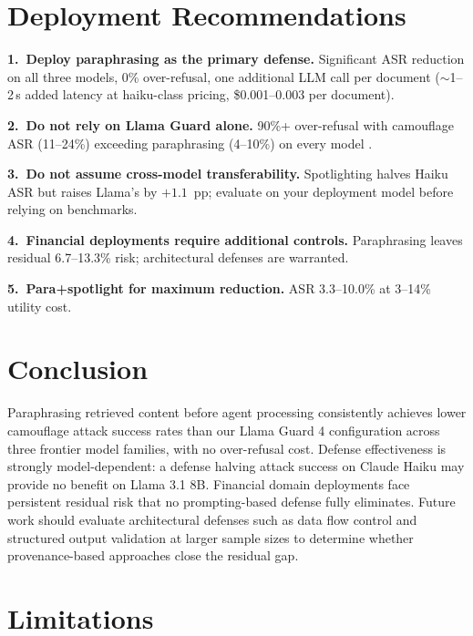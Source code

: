 \documentclass[11pt]{article}
\begin{document}
\section{Deployment Recommendations}

\textbf{1.~Deploy paraphrasing as the primary defense.}
Significant ASR reduction on all three models, 0\% over-refusal,
one additional LLM call per document ($\sim$1--2\,s added latency
at haiku-class pricing, \$0.001--0.003 per document).

\textbf{2.~Do not rely on Llama Guard alone.}
90\%+ over-refusal with camouflage ASR (11--24\%) exceeding
paraphrasing (4--10\%) on every model \citep{meta2024llamaguard3,inan2023llama}.

\textbf{3.~Do not assume cross-model transferability.}
Spotlighting halves Haiku ASR but raises Llama's by $+1.1$~pp;
evaluate on your deployment model before relying on benchmarks.

\textbf{4.~Financial deployments require additional controls.}
Paraphrasing leaves residual 6.7--13.3\% risk; architectural defenses
\citep{wallace2024instruction} are warranted.

\textbf{5.~Para+spotlight for maximum reduction.}
ASR 3.3--10.0\% at 3--14\% utility cost.

\section{Conclusion}

Paraphrasing retrieved content before agent processing consistently
achieves lower camouflage attack success rates than our Llama Guard 4
configuration across three frontier model families, with no over-refusal cost. Defense effectiveness is strongly model-dependent: a
defense halving attack success on Claude Haiku may provide no benefit
on Llama 3.1 8B. Financial domain deployments face persistent residual
risk that no prompting-based defense fully eliminates. Future work
should evaluate architectural defenses such as data flow control
\citep{google2025camel} and structured output validation at larger
sample sizes to determine whether provenance-based approaches close
the residual gap.

\section*{Limitations}
\end{document}
